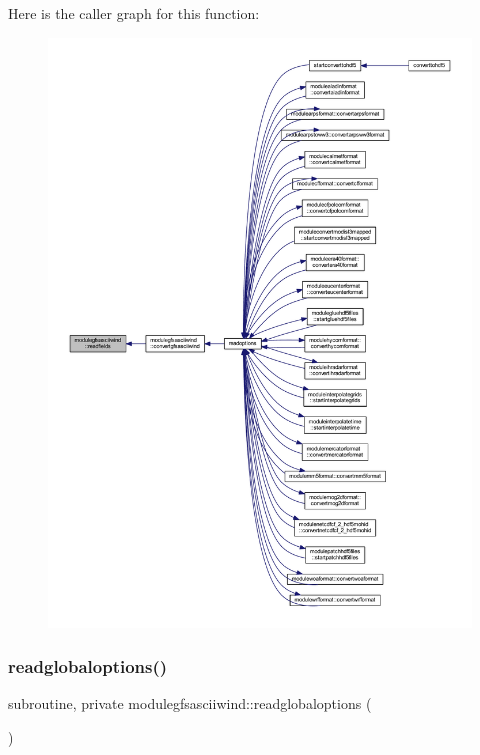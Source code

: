 Here is the caller graph for this function\+:\nopagebreak
\begin{figure}[H]
\begin{center}
\leavevmode
\includegraphics[width=350pt]{namespacemodulegfsasciiwind_ac5d334e8c6ff65db3f44823f9a106515_icgraph}
\end{center}
\end{figure}
\mbox{\label{namespacemodulegfsasciiwind_a8c3d7b7c4a1b9cba9c41386d4584b037}} 
\subsubsection{\texorpdfstring{readglobaloptions()}{readglobaloptions()}}
{\footnotesize\ttfamily subroutine, private modulegfsasciiwind\+::readglobaloptions (\begin{DoxyParamCaption}{ }\end{DoxyParamCaption})\hspace{0.3cm}{\ttfamily [private]}}

